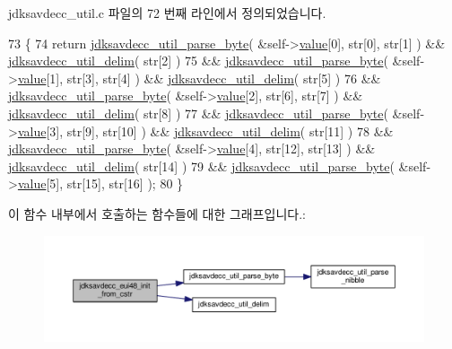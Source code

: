 jdksavdecc\+\_\+util.\+c 파일의 72 번째 라인에서 정의되었습니다.


\begin{DoxyCode}
73 \{
74     \textcolor{keywordflow}{return} \hyperlink{group__util_ga82a47aacd3de4b522a4ac6a52d72e17e}{jdksavdecc\_util\_parse\_byte}( &self->\hyperlink{structjdksavdecc__eui48_a18b93f04637cf37688ec10a33a0cbc26}{value}[0], str[0], str[1] ) && 
      \hyperlink{jdksavdecc__util_8c_a9b2d5ec940714d3c9cec91adafc62e6b}{jdksavdecc\_util\_delim}( str[2] )
75            && \hyperlink{group__util_ga82a47aacd3de4b522a4ac6a52d72e17e}{jdksavdecc\_util\_parse\_byte}( &self->\hyperlink{structjdksavdecc__eui48_a18b93f04637cf37688ec10a33a0cbc26}{value}[1], str[3], str[4] ) 
      && \hyperlink{jdksavdecc__util_8c_a9b2d5ec940714d3c9cec91adafc62e6b}{jdksavdecc\_util\_delim}( str[5] )
76            && \hyperlink{group__util_ga82a47aacd3de4b522a4ac6a52d72e17e}{jdksavdecc\_util\_parse\_byte}( &self->\hyperlink{structjdksavdecc__eui48_a18b93f04637cf37688ec10a33a0cbc26}{value}[2], str[6], str[7] ) 
      && \hyperlink{jdksavdecc__util_8c_a9b2d5ec940714d3c9cec91adafc62e6b}{jdksavdecc\_util\_delim}( str[8] )
77            && \hyperlink{group__util_ga82a47aacd3de4b522a4ac6a52d72e17e}{jdksavdecc\_util\_parse\_byte}( &self->\hyperlink{structjdksavdecc__eui48_a18b93f04637cf37688ec10a33a0cbc26}{value}[3], str[9], str[10] )
       && \hyperlink{jdksavdecc__util_8c_a9b2d5ec940714d3c9cec91adafc62e6b}{jdksavdecc\_util\_delim}( str[11] )
78            && \hyperlink{group__util_ga82a47aacd3de4b522a4ac6a52d72e17e}{jdksavdecc\_util\_parse\_byte}( &self->\hyperlink{structjdksavdecc__eui48_a18b93f04637cf37688ec10a33a0cbc26}{value}[4], str[12], str[13] 
      ) && \hyperlink{jdksavdecc__util_8c_a9b2d5ec940714d3c9cec91adafc62e6b}{jdksavdecc\_util\_delim}( str[14] )
79            && \hyperlink{group__util_ga82a47aacd3de4b522a4ac6a52d72e17e}{jdksavdecc\_util\_parse\_byte}( &self->\hyperlink{structjdksavdecc__eui48_a18b93f04637cf37688ec10a33a0cbc26}{value}[5], str[15], str[16] 
      );
80 \}
\end{DoxyCode}


이 함수 내부에서 호출하는 함수들에 대한 그래프입니다.\+:
\nopagebreak
\begin{figure}[H]
\begin{center}
\leavevmode
\includegraphics[width=350pt]{group__eui48_ga55b46df59ed49eb9a301e716f601d632_cgraph}
\end{center}
\end{figure}




